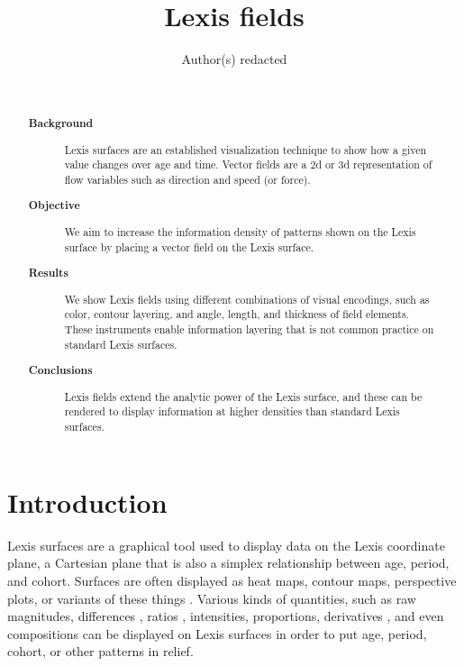 \documentclass{article}
\begin{document}
\title{Lexis fields}


\author{Author(s) redacted}

\maketitle

\begin{abstract}
~
\begin{description}
\item[\textbf{Background}] Lexis surfaces are an established visualization
technique to show how a given value changes over age and time. Vector fields are
a 2d or 3d representation of flow variables such as direction and speed (or
force). 
\item[\textbf{Objective}] We aim to increase the information density of patterns
shown on the Lexis surface by placing a vector field on the Lexis surface. 
\item[\textbf{Results}] We show Lexis fields using different combinations of
visual encodings, such as color, contour layering, and angle, length,
and thickness of field elements. These instruments enable information layering
that is not common practice on standard Lexis surfaces.
\item[\textbf{Conclusions}] Lexis fields extend the analytic power of the Lexis
surface, and these can be rendered to display information at higher densities
than standard Lexis surfaces.
\end{description}
\end{abstract}

\onehalfspacing
\section*{Introduction}
Lexis surfaces are a graphical tool used to display data on the Lexis coordinate plane, a Cartesian plane that is also a simplex relationship between age, period, and cohort. Surfaces are often displayed as heat maps, contour maps, perspective plots, or variants of these things \citep{vaupel1987thousands}. Various kinds of quantities, such as raw magnitudes, differences \citep{minton2017visualising}, ratios \citep{canudas2005age}, intensities, proportions, derivatives \citep{rau2017visualizing}, and even compositions \citep{scholey2017visualizing} can be displayed on Lexis surfaces in order to put age, period, cohort, or other patterns in relief. 
\end{document}
